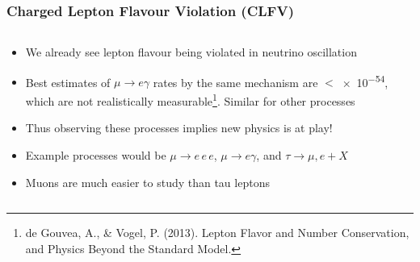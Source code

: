 \documentclass[11pt]{beamer}
\begin{document}
\begin{frame}
    \frametitle{Charged Lepton Flavour Violation (CLFV)}
    \begin{columns}[c]
        \begin{column}{0.6\textwidth}
            \begin{itemize}
                \item We already see lepton flavour being violated in neutrino oscillation
                \item Best estimates of $\mu \rightarrow e\gamma$ rates by the same mechanism are $<$\num{e-54}, which are not realistically measurable\footnote[frame]{de Gouvea, A., \& Vogel, P. (2013). Lepton Flavor and Number Conservation, and Physics Beyond the Standard Model.}. Similar for other processes
                \item Thus observing these processes implies new physics is at play!
                \item Example processes would be $\mu\rightarrow e\,e\,e$, $\mu \rightarrow e\gamma$, and $\tau \rightarrow \mu,e + X$
                \item Muons are much easier to study than tau leptons
            \end{itemize}
        \end{column}

        \begin{column}{0.4\textwidth}
        \end{column}
    \end{columns}
\end{frame}
\end{document}
